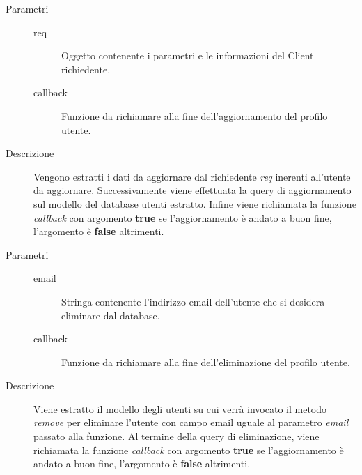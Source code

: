 \begin{description}
\begin{mldescription}
 		 \hfill
 			\begin{description}
 				\item[Parametri] \hfill
 					\begin{description}
 						\item[req] 
 							Oggetto contenente i parametri e le informazioni del Client richiedente.
 						\item[callback]
 							Funzione da richiamare alla fine dell'aggiornamento del profilo utente.
 					\end{description}
 				\item[Descrizione]
 				Vengono estratti i dati da aggiornare dal richiedente \textit{req} inerenti all'utente da aggiornare. Successivamente viene effettuata la query di aggiornamento sul modello del database utenti estratto. Infine viene richiamata la funzione \textit{callback} con argomento \textbf{true} se l'aggiornamento è andato a buon fine, l'argomento è \textbf{false} altrimenti.
 			\end{description}
 			
 		 \hfill
 			\begin{description}
 				\item[Parametri] \hfill
 					\begin{description}
 						\item[email]
 							Stringa contenente l'indirizzo email dell'utente che si desidera eliminare dal database.
 						\item[callback]
 							Funzione da richiamare alla fine dell'eliminazione del profilo utente.
 					\end{description}
 				\item[Descrizione]
 				Viene estratto il modello degli utenti su cui verrà invocato il metodo \textit{remove} per eliminare l'utente con campo email uguale al parametro \textit{email} passato alla funzione. Al termine della query di eliminazione, viene richiamata la funzione \textit{callback} con argomento \textbf{true} se l'aggiornamento è andato a buon fine, l'argomento è \textbf{false} altrimenti.
 			\end{description}
 			
 	\end{mldescription}
\end{description}



